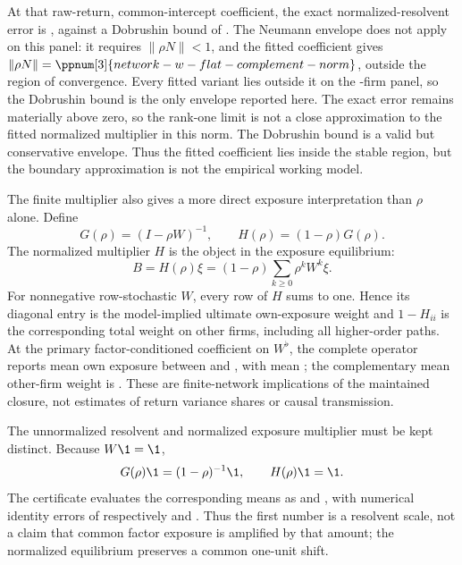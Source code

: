 At that raw-return, common-intercept coefficient, the exact
normalized-resolvent error is
, against a Dobrushin bound of
.
The Neumann envelope does not apply on this panel: it requires
$\lVert\rho N\rVert<1$, and the fitted coefficient gives
$\lVert\rho N\rVert=\ppnum[3]{network-w-flat-complement-norm}$, outside the
region of convergence.
Every fitted variant lies outside it on the
-firm panel, so the Dobrushin bound is the only
envelope reported here.
The exact error remains materially above zero, so the rank-one limit is not a
close approximation to the fitted normalized multiplier in this norm.
The Dobrushin bound is a valid but conservative envelope.
Thus the fitted coefficient lies inside the stable region, but the boundary
approximation is not the empirical working model.

The finite multiplier also gives a more direct exposure interpretation than
$\rho$ alone.  Define
\[
  G(\rho)=(I-\rho W)^{-1},
  \qquad
  H(\rho)=(1-\rho)G(\rho).
\]
The normalized multiplier $H$ is the object in the exposure equilibrium:
\begin{equation}
  B=H(\rho)\xi
  =(1-\rho)\sum_{k\geq 0}\rho^k W^k\xi .
  \label{eq:finite-rho-exposure-weights}
\end{equation}
For nonnegative row-stochastic $W$, every row of $H$ sums to one.  Hence its
diagonal entry is the model-implied ultimate own-exposure weight and
$1-H_{ii}$ is the corresponding total weight on other firms, including all
higher-order paths.  At the primary factor-conditioned coefficient on $W^\flat$, the
complete operator
reports mean own exposure between
 and
, with mean
; the complementary mean other-firm
weight is .  These are
finite-network implications of the maintained closure, not estimates of return
variance shares or causal transmission.

The unnormalized resolvent and normalized exposure multiplier must be kept
distinct.  Because $W\1=\1$,
\[
  G(\rho)\1=(1-\rho)^{-1}\1,\qquad H(\rho)\1=\1.
\]
The certificate evaluates the corresponding means as
 and
, with numerical identity errors
of respectively
 and
.  Thus the first number is a
resolvent scale, not a claim that common factor exposure is amplified by that
amount; the normalized equilibrium preserves a common one-unit shift.

